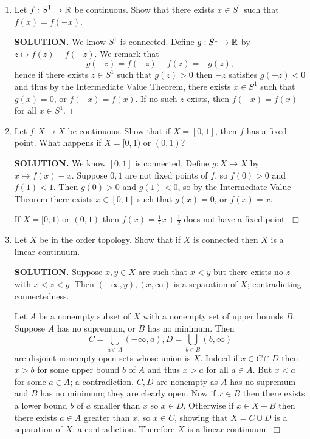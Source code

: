 \documentclass{article}
\begin{document}
\begin{enumerate}
    \item Let $f: S^1 \rightarrow \mathbb{R}$ be continuous. Show that there exists $x\in S^1$ such that $f(x) = f(-x)$.

    {\bf SOLUTION.} We know $S^1$ is connected. Define $g: S^1 \rightarrow \mathbb{R}$ by $z \mapsto f(z) - f(-z)$. We remark that
    $$g(-z) = f(-z) - f(z) = -g(z),$$
    hence if there exists $z \in S^1$ such that $g(z) > 0$ then $-z$ satisfies $g(-z) < 0$ and thus by the Intermediate Value Theorem, there exists $x \in S^1$ such that $g(x) = 0$, or $f(-x) = f(x)$. If no such $z$ exists, then $f(-x) = f(x)$ for all $x \in S^1$. $\Box$

    \item Let $f: X \rightarrow X$ be continuous. Show that if $X = [0, 1]$, then $f$ has a fixed point. What happens if $X = [0, 1)$ or $(0, 1)$?

    {\bf SOLUTION.} We know $[0, 1]$ is connected. Define $g: X \rightarrow X$ by $x \mapsto f(x) - x$. Suppose $0,1$ are not fixed points of $f$, so $f(0) > 0$ and $f(1) < 1$. Then $g(0) > 0$ and $g(1) < 0$, so by the Intermediate Value Theorem there exists $x \in [0, 1]$ such that $g(x) = 0$, or $f(x) = x$.

    If $X = [0, 1)$ or $(0, 1)$ then $f(x) = \frac12 x + \frac12$ does not have a fixed point. $\Box$

    \item Let $X$ be in the order topology. Show that if $X$ is connected then $X$ is a linear continuum.

    {\bf SOLUTION.} Suppose $x, y \in X$ are such that $x < y$ but there exists no $z$ with $x < z < y$. Then $(-\infty, y), (x, \infty)$ is a separation of $X$; contradicting connectedness.

    Let $A$ be a nonempty subset of $X$ with a nonempty set of upper bounds $B$. Suppose $A$ has no supremum, or $B$ has no minimum. Then
    $$C = \bigcup_{a \in A} (-\infty, a), D = \bigcup_{b \in B} (b, \infty)$$
    are disjoint nonempty open sets whose union is $X$. Indeed if $x \in C \cap D$ then $x > b$ for some upper bound $b$ of $A$ and thus $x > a$ for all $a \in A$. But $x < a$ for some $a \in A$; a contradiction. $C, D$ are nonempty as $A$ has no supremum and $B$ has no minimum; they are clearly open. Now if $x \in B$ then there exists a lower bound $b$ of $a$ smaller than $x$ so $x \in D$. Otherwise if $x \in X - B$ then there exists $a \in A$ greater than $x$, so $x \in C$, showing that $X = C \cup D$ is a separation of $X$; a contradiction. Therefore $X$ is a linear continuum. $\Box$


\end{enumerate}
\end{document}
